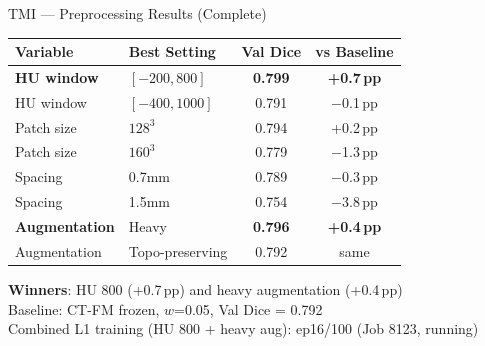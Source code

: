 \documentclass[aspectratio=169,10pt]{beamer}
\newcommand{\good}[1]{\textcolor{green!60!black}{\textbf{#1}}}
\newcommand{\bad}[1]{\textcolor{red!70!black}{#1}}
\newcommand{\pp}{\,pp}
\begin{document}
\begin{frame}{TMI --- Preprocessing Results (Complete)}

\centering
\begin{tabular}{l l c c}
\toprule
\textbf{Variable} & \textbf{Best Setting} & \textbf{Val Dice} & \textbf{vs Baseline} \\
\midrule
\good{HU window} & $[-200, 800]$ & \good{0.799} & \good{+0.7\pp} \\
HU window & $[-400, 1000]$ & 0.791 & $-$0.1\pp \\
Patch size & $128^3$ & 0.794 & +0.2\pp \\
Patch size & $160^3$ & \bad{0.779} & $-$1.3\pp \\
Spacing & 0.7mm & 0.789 & $-$0.3\pp \\
Spacing & 1.5mm & \bad{0.754} & $-$3.8\pp \\
\good{Augmentation} & Heavy & \good{0.796} & \good{+0.4\pp} \\
Augmentation & Topo-preserving & 0.792 & same \\
\bottomrule
\end{tabular}

\vspace{0.3cm}
\textbf{Winners}: HU 800 (+0.7\pp) and heavy augmentation (+0.4\pp)\\
Baseline: CT-FM frozen, $w$=0.05, Val Dice = 0.792\\
Combined L1 training (HU 800 + heavy aug): ep16/100 (Job 8123, running)

\end{frame}
\end{document}
